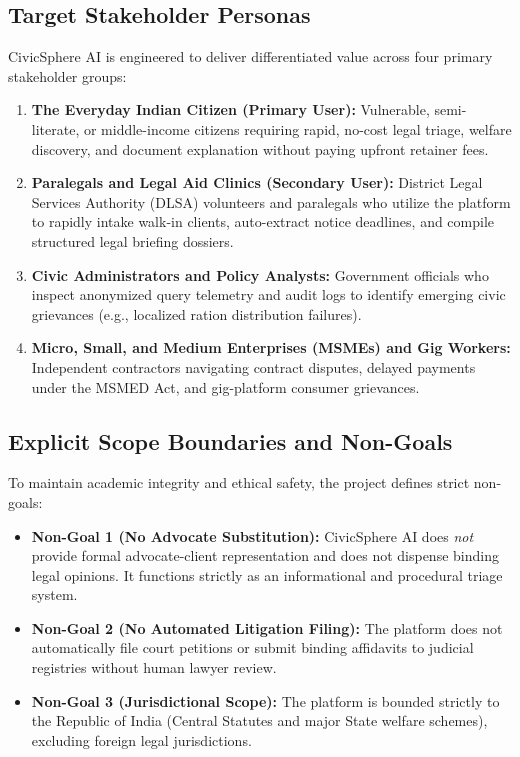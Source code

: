 \subsection{Target Stakeholder Personas}
CivicSphere AI is engineered to deliver differentiated value across four primary stakeholder groups:
\begin{enumerate}
    \item \textbf{The Everyday Indian Citizen (Primary User):} Vulnerable, semi-literate, or middle-income citizens requiring rapid, no-cost legal triage, welfare discovery, and document explanation without paying upfront retainer fees.
    \item \textbf{Paralegals and Legal Aid Clinics (Secondary User):} District Legal Services Authority (DLSA) volunteers and paralegals who utilize the platform to rapidly intake walk-in clients, auto-extract notice deadlines, and compile structured legal briefing dossiers.
    \item \textbf{Civic Administrators and Policy Analysts:} Government officials who inspect anonymized query telemetry and audit logs to identify emerging civic grievances (e.g., localized ration distribution failures).
    \item \textbf{Micro, Small, and Medium Enterprises (MSMEs) and Gig Workers:} Independent contractors navigating contract disputes, delayed payments under the MSMED Act, and gig-platform consumer grievances.
\end{enumerate}

\subsection{Explicit Scope Boundaries and Non-Goals}
To maintain academic integrity and ethical safety, the project defines strict non-goals:
\begin{itemize}
    \item \textbf{Non-Goal 1 (No Advocate Substitution):} CivicSphere AI does \textit{not} provide formal advocate-client representation and does not dispense binding legal opinions. It functions strictly as an informational and procedural triage system.
    \item \textbf{Non-Goal 2 (No Automated Litigation Filing):} The platform does not automatically file court petitions or submit binding affidavits to judicial registries without human lawyer review.
    \item \textbf{Non-Goal 3 (Jurisdictional Scope):} The platform is bounded strictly to the Republic of India (Central Statutes and major State welfare schemes), excluding foreign legal jurisdictions.
\end{itemize}

